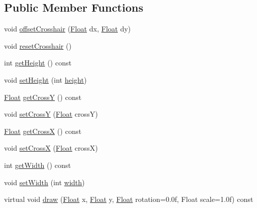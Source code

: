 \subsection*{Public Member Functions}
\begin{DoxyCompactItemize}
\item 
void \hyperlink{classZeta_1_1Crosshair_a0b34e157105bf3826dce7bf734a8ceac}{offset\+Crosshair} (\hyperlink{namespaceZeta_a1e0a1265f9b3bd3075fb0fabd39088ba}{Float} dx, \hyperlink{namespaceZeta_a1e0a1265f9b3bd3075fb0fabd39088ba}{Float} dy)
\item 
void \hyperlink{classZeta_1_1Crosshair_a35242211c7d422ce483e3449c3030c73}{reset\+Crosshair} ()
\item 
int \hyperlink{classZeta_1_1Crosshair_a7038919a21855c9887f1ad6df99879c3}{get\+Height} () const 
\item 
void \hyperlink{classZeta_1_1Crosshair_a15e84f752038333c88a271271726d38a}{set\+Height} (int \hyperlink{classZeta_1_1Crosshair_a18b73261c9cebb4413675105c0ff25a9}{height})
\item 
\hyperlink{namespaceZeta_a1e0a1265f9b3bd3075fb0fabd39088ba}{Float} \hyperlink{classZeta_1_1Crosshair_a56ac8566445e45a3e988ffbb9d7e12a0}{get\+Cross\+Y} () const 
\item 
void \hyperlink{classZeta_1_1Crosshair_a478784b6ca1277fd3645bfb84f49444b}{set\+Cross\+Y} (\hyperlink{namespaceZeta_a1e0a1265f9b3bd3075fb0fabd39088ba}{Float} cross\+Y)
\item 
\hyperlink{namespaceZeta_a1e0a1265f9b3bd3075fb0fabd39088ba}{Float} \hyperlink{classZeta_1_1Crosshair_ae1a04dc41c936952776c135fb9b1a2f6}{get\+Cross\+X} () const 
\item 
void \hyperlink{classZeta_1_1Crosshair_a08fcd8105bf34b47b8a84d3360f71243}{set\+Cross\+X} (\hyperlink{namespaceZeta_a1e0a1265f9b3bd3075fb0fabd39088ba}{Float} cross\+X)
\item 
int \hyperlink{classZeta_1_1Crosshair_a23c128c3e556e7f37bacde499c083951}{get\+Width} () const 
\item 
void \hyperlink{classZeta_1_1Crosshair_a83582b3d704f5ff77d51c99445f9f7f5}{set\+Width} (int \hyperlink{classZeta_1_1Crosshair_aabcdae88e34ee8532c8d755adc9504c4}{width})
\item 
virtual void \hyperlink{classZeta_1_1Crosshair_aec17be6aca9cb0a92c8c9c8f12dae003}{draw} (\hyperlink{namespaceZeta_a1e0a1265f9b3bd3075fb0fabd39088ba}{Float} x, \hyperlink{namespaceZeta_a1e0a1265f9b3bd3075fb0fabd39088ba}{Float} y, \hyperlink{namespaceZeta_a1e0a1265f9b3bd3075fb0fabd39088ba}{Float} rotation=0.\+0f, Float scale=1.\+0f) const 

\end{DoxyCompactItemize}
